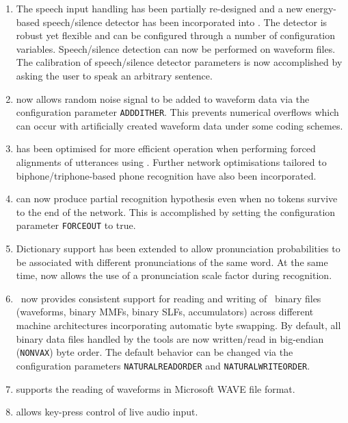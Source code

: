 \begin{enumerate}

\item The speech input handling has been partially re-designed and a new 
energy-based speech/silence detector has been incorporated into .
The detector is robust yet flexible and can be configured through a number of
configuration variables. Speech/silence detection can now be performed on
waveform files. The calibration of speech/silence detector parameters is now
accomplished by asking the user to speak an arbitrary sentence.

\item {} now allows random noise signal to be added to waveform
data via the configuration parameter \texttt{ADDDITHER}. This prevents
numerical overflows which can occur with artificially created waveform data
under some coding schemes.

\item {} has been optimised for more efficient operation when
performing forced alignments of utterances using . Further
network optimisations tailored to biphone/triphone-based phone recognition 
have also been incorporated.

\item {} can now produce partial recognition hypothesis even when 
no tokens survive to the end of the network. This is accomplished by setting
the  configuration parameter \texttt{FORCEOUT} to true.

\item Dictionary support has been extended to allow pronunciation probabilities
to be associated with different pronunciations of the same word. At the same
time,  now allows the use of a pronunciation scale factor during
recognition.

\item \HTK\ now provides consistent support for reading and writing of \HTK\ 
binary files (waveforms, binary MMFs, binary SLFs,  accumulators)
across different machine architectures incorporating automatic byte swapping.
By default, all binary data files handled by the tools are now written/read in
big-endian (\texttt{NONVAX}) byte order. The default behavior can be changed
via the configuration parameters \texttt{NATURALREADORDER} and
\texttt{NATURALWRITEORDER}.

\item {} supports the reading of waveforms in Microsoft WAVE file
format.

\item {} allows key-press control of live audio input.

\end{enumerate}




